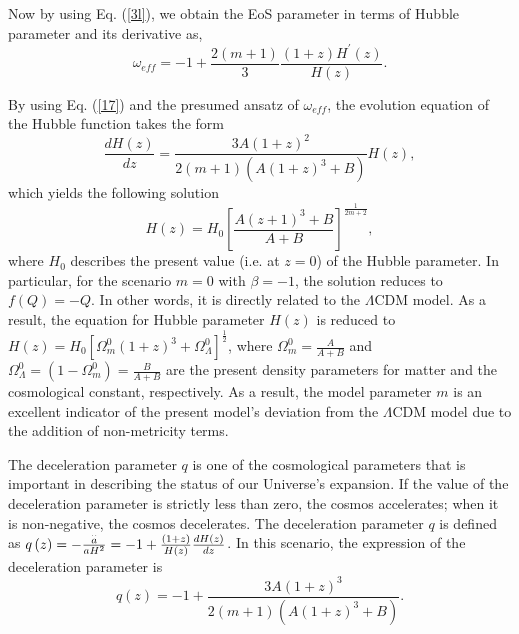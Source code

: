 \documentclass[prd,superscriptaddress,amsfonts,amssymb,amsmath,showpacs,twocolumn]{revtex4-2}
\begin{document}
Now by using Eq. (\ref{3l}), we obtain the EoS parameter in terms of Hubble
parameter and its derivative as, 
\begin{equation}
\omega_{eff} =-1+\frac{2\left( m+1\right) }{3}\frac{\left( 1+z\right)
H^{\prime }\left( z\right) }{H\left( z\right) }.
\label{17}
\end{equation}

By using Eq. (\ref{17}) and the presumed ansatz of $\omega _{eff}$, the
evolution equation of the Hubble function takes the form 
\begin{equation}
\frac{dH\left( z\right) }{dz}=\frac{3A\left( 1+z\right) ^{2}}{2\left(
m+1\right) \left( A\left( 1+z\right) ^{3}+B\right) }H\left( z\right), 
\end{equation}%
which yields the following solution 
\begin{equation}
H\left( z\right) =H_{0}\left[ \frac{A(z+1)^{3}+B}{A+B}\right] ^{\frac{1}{2m+2%
}},  \label{H1}
\end{equation}%
where $H_{0}$ describes the present value (i.e. at $z=0$) of the Hubble
parameter. In particular, for the scenario $m=0$ with $\beta =-1$, the
solution reduces to $f\left( Q\right) =-Q$. In other words, it is directly
related to the $\Lambda $CDM model. As a result, the equation for Hubble
parameter $H\left( z\right) $ is reduced to $H\left( z\right) =H_{0}\left[
\Omega _{m}^{0}\left( 1+z\right) ^{3}+\Omega _{\Lambda }^{0}\right] ^{\frac{1%
}{2}}$, where $\Omega _{m}^{0}=\frac{A}{A+B}$ and $\Omega _{\Lambda
}^{0}=\left( 1-\Omega _{m}^{0}\right) =\frac{B}{A+B}$ are the present
density parameters for matter and the cosmological constant, respectively.
As a result, the model parameter $m$ is an excellent indicator of the
present model's deviation from the $\Lambda $CDM model due to the addition
of non-metricity terms.

The deceleration parameter $q$ is one of the cosmological parameters that is
important in describing the status of our Universe's expansion. If the value
of the deceleration parameter is strictly less than zero, the cosmos
accelerates; when it is non-negative, the cosmos decelerates. The
deceleration parameter $q$ is defined as $q\left( z\right) =-\frac{\overset{%
..}{a}}{aH^{2}}=-1+\frac{\left( 1+z\right) }{H\left( z\right) }\frac{%
dH\left( z\right) }{dz}$. In this scenario, the expression of the
deceleration parameter is%
\begin{equation}
q\left( z\right) =-1+\frac{3A(1+z)^{3}}{2(m+1)\left( A(1+z)^{3}+B\right) }.
\label{qz1}
\end{equation}
\end{document}
